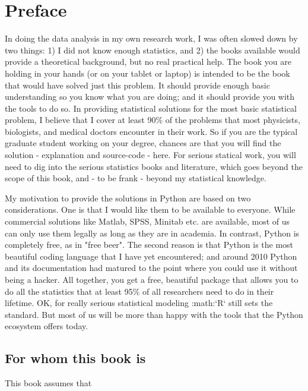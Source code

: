 \chapter*{Preface}

In doing the data analysis in my own research work, I was often slowed down by two things: 1) I did not know enough statistics, and 2) the books available would provide a theoretical background, but no real practical help. The book you are holding in your hands (or on your tablet or laptop) is intended to be the book that would have solved just this problem. It should provide enough basic understanding so you know what you are doing; and it should provide you with the tools to do so. In providing statistical solutions for the most basic statistical problem, I believe that I cover at least 90\% of the problems that most physicists, biologists, and medical doctors encounter in their work. So if you are the typical graduate student working on your degree, chances are that you will find the solution - explanation and source-code - here.
For serious statical work, you will need to dig into the serious statistics books and literature, which goes beyond the scope of this book, and - to be frank - beyond my statistical knowledge.

My motivation to provide the solutions in Python are based on two considerations. One is that I would like them to be available to everyone. While commercial solutions like Matlab, SPSS, Minitab etc. are available, most of us can only use them legally as long as they are in academia. In contrast, Python is completely free, as in "free beer". The second reason is that Python is the most beautiful coding language that I have yet encountered; and around 2010 Python and its documentation had matured to
the point where you could use it without being a hacker. All together, you get a free, beautiful package that allows you to do all the statistics that at least 95\% of all researchers need to do in their lifetime. OK, for really serious statistical modeling :math:`R` still sets the standard.
But most of us will be more than happy with the tools that the Python ecosystem offers today.

\section*{For whom this book is}

This book assumes that

